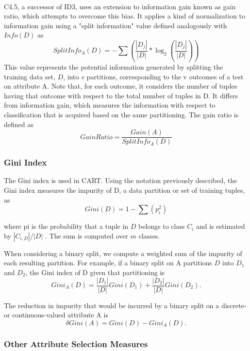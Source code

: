 \paragraph{}
C4.5, a successor of ID3, uses an extension to information gain known as gain ratio, which attempts to
overcome this bias. It applies a kind of normalization to information gain using a "split information" value
defined analogously with $Info(D)$ as $$SplitInfo_A(D)=-\sum(\dfrac{|D_j|}{|D|}* \log_2(\dfrac{|D_j|}{|D|}))$$
This value represents the potential information generated by splitting the training data set, $D$, into $v$ partitions,
corresponding to the v outcomes of a test on attribute A. Note that, for each outcome, it considers the number of
tuples having that outcome with respect to the total number of tuples in D. It differs from information gain,
which measures the information with respect to classification that is acquired based on the same partitioning.
The gain ratio is defined as $$GainRatio=\dfrac{Gain(A)}{SplitInfo_A(D)} $$

\subsubsection{Gini Index}

The Gini index is used in CART. Using the notation previously described, the Gini index measures the impurity
of D, a data partition or set of training tuples, as $$Gini(D)=1-\sum(p_i^{2}) $$

where pi is the probability that a tuple in $D$ belongs to class $C_i$ and is estimated by $|C_{i,D}|/|D|$ . The sum is computed over $m$ classes.

When considering a binary split, we compute a weighted sum of the impurity of each resulting partition. For
example, if a binary split on A partitions $D$ into $D_1$ and $D_2$, the Gini index of D given that partitioning is
$$Gini_A(D)=\dfrac{|D_1|}{|D|}Gini(D_1) +  \dfrac{|D_2|}{|D|}Gini(D_2).$$

The reduction in impurity that would be incurred by a binary split on a discrete- or continuous-valued attribute
A is $$\delta{}Gini(A)=Gini(D)-Gini_A(D).$$

\subsubsection{Other Attribute Selection Measures}


